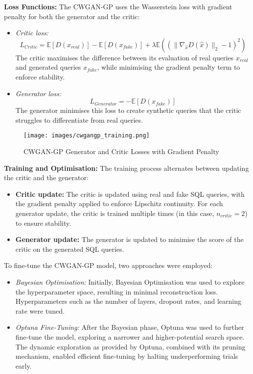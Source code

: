 \documentclass[journal]{IEEEtran}
\begin{document}
\textbf{Loss Functions:} The CWGAN-GP uses the Wasserstein loss with gradient penalty for both the generator and the critic:
\begin{itemize}
    \item \textit{Critic loss:}
    \[
    L_{Critic} = \mathbb{E}[D(x_{real})] - \mathbb{E}[D(x_{fake})] + \lambda \mathbb{E} \left( ( \|\nabla_{\hat{x}} D(\hat{x}) \|_2 - 1 )^2 \right)
    \]
    The critic maximises the difference between its evaluation of real queries \( x_{real} \) and generated queries \( x_{fake} \), while minimising the gradient penalty term to enforce stability.
    \item \textit{Generator loss:}
    \[
    L_{Generator} = - \mathbb{E}[D(x_{fake})]
    \]
    The generator minimises this loss to create synthetic queries that the critic struggles to differentiate from real queries.
\end{itemize}

\begin{figure}[H]
    \centering
    \texttt{[image: images/cwgangp\_training.png]}
    \caption{CWGAN-GP Generator and Critic Losses with Gradient Penalty}
    \label{fig:cwgan_loss}
\end{figure}

\textbf{Training and Optimisation:}
The training process alternates between updating the critic and the generator:
\begin{itemize}
    \item \textbf{Critic update:} The critic is updated using real and fake SQL queries, with the gradient penalty applied to enforce Lipschitz continuity. For each generator update, the critic is trained multiple times (in this case, \( n_{critic} = 2 \)) to ensure stability.
    \item \textbf{Generator update:} The generator is updated to minimise the score of the critic on the generated SQL queries.
\end{itemize}

To fine-tune the CWGAN-GP model, two approaches were employed:
\begin{itemize}
    \item \textit{Bayesian Optimisation:} Initially, Bayesian Optimisation was used to explore the hyperparameter space, resulting in minimal reconstruction loss. Hyperparameters such as the number of layers, dropout rates, and learning rate were tuned.
    \item \textit{Optuna Fine-Tuning:} After the Bayesian phase, Optuna was used to further fine-tune the model, exploring a narrower and higher-potential search space. The dynamic exploration as provided by Optuna, combined with its pruning mechanism, enabled efficient fine-tuning by halting underperforming trials early.
\end{itemize}
\end{document}
